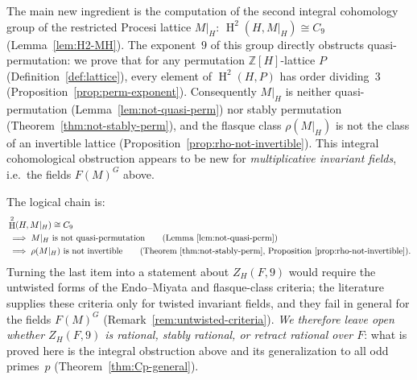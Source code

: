 \documentclass[12pt,a4paper]{article}
\theoremstyle{definition}
\DeclareMathOperator{\Ext}{Ext}
\DeclareMathOperator{\coh}{H}
\begin{document}
The main new ingredient is the computation of the second integral cohomology
group of the restricted Procesi lattice \(M|_H\):
\(\coh^2(H, M|_H) \cong C_9\) (Lemma~\ref{lem:H2-MH}).  The exponent~\(9\) of
this group directly obstructs quasi-permutation: we prove that for any
permutation \(\mathbb{Z}[H]\)-lattice \(P\) (Definition~\ref{def:lattice}),
every element of \(\coh^2(H, P)\) has order dividing~\(3\)
(Proposition~\ref{prop:perm-exponent}).
Consequently \(M|_H\) is neither quasi-permutation
(Lemma~\ref{lem:not-quasi-perm}) nor stably permutation
(Theorem~\ref{thm:not-stably-perm}), and the flasque class
\(\rho(M|_H)\) is not the class of an invertible lattice
(Proposition~\ref{prop:rho-not-invertible}).  This integral cohomological
obstruction appears to be new for \emph{multiplicative invariant fields},
i.e.\ the fields \(F(M)^G\) above.

The logical chain is:
\[
\begin{aligned}
&\coh^2(H, M|_H) \cong C_9 \\
&\;\Longrightarrow\; M|_H \text{ is not quasi-permutation}
  \qquad\text{(Lemma~\ref{lem:not-quasi-perm})} \\
&\;\Longrightarrow\; \rho(M|_H) \text{ is not invertible}
  \qquad\text{(Theorem~\ref{thm:not-stably-perm},
  Proposition~\ref{prop:rho-not-invertible})}.
\end{aligned}
\]
Turning the last item into a statement about \(Z_H(F,9)\) would require
the untwisted forms of the Endo--Miyata and flasque-class criteria; the
literature supplies these criteria only for twisted invariant fields, and
they fail in general for the fields \(F(M)^G\)
(Remark~\ref{rem:untwisted-criteria}).  \emph{We therefore leave open
whether \(Z_H(F,9)\) is rational, stably rational, or retract rational
over \(F\)}: what is proved here is the integral obstruction above and
its generalization to all odd primes~\(p\) (Theorem~\ref{thm:Cp-general}).

%
\end{document}
